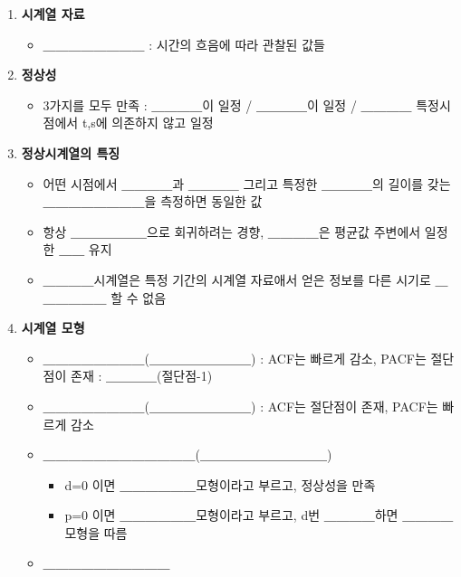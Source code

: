 \documentclass[11pt]{article}
\providecommand{\tightlist}{%
      \setlength{\itemsep}{0pt}\setlength{\parskip}{0pt}}
\begin{document}
\begin{enumerate}
\def\labelenumi{\arabic{enumi}.}
\tightlist
\item
  \textbf{시계열 자료}

  \begin{itemize}
  \tightlist
  \item
    ＿＿＿＿＿＿＿＿ : 시간의 흐음에 따라 관찰된 값들
  \end{itemize}
\item
  \textbf{정상성}

  \begin{itemize}
  \tightlist
  \item
    3가지를 모두 만족 : ＿＿＿＿이 일정 / ＿＿＿＿이 일정 / ＿＿＿＿
    특정시점에서 t,s에 의존하지 않고 일정
  \end{itemize}
\item
  \textbf{정상시계열의 특징}

  \begin{itemize}
  \tightlist
  \item
    어떤 시점에서 ＿＿＿＿과 ＿＿＿＿ 그리고 특정한 ＿＿＿＿의 길이를
    갖는 ＿＿＿＿＿＿＿＿을 측정하면 동일한 값
  \item
    항상 ＿＿＿＿＿＿으로 회귀하려는 경향, ＿＿＿＿은 평균값 주변에서
    일정한 ＿＿ 유지
  \item
    ＿＿＿＿시계열은 특정 기간의 시계열 자료애서 얻은 정보를 다른 시기로
    ＿＿＿＿＿＿ 할 수 없음
  \end{itemize}
\item
  \textbf{시계열 모형}

  \begin{itemize}
  \tightlist
  \item
    ＿＿＿＿＿＿＿＿(＿＿＿＿＿＿＿＿) : ACF는 빠르게 감소, PACF는
    절단점이 존재 : ＿＿＿＿(절단점-1)
  \item
    ＿＿＿＿＿＿＿＿(＿＿＿＿＿＿＿＿) : ACF는 절단점이 존재, PACF는
    빠르게 감소
  \item
    ＿＿＿＿＿＿＿＿＿＿＿＿(＿＿＿＿＿＿＿＿＿＿)

    \begin{itemize}
    \tightlist
    \item
      d=0 이면 ＿＿＿＿＿＿모형이라고 부르고, 정상성을 만족
    \item
      p=0 이면 ＿＿＿＿＿＿모형이라고 부르고, d번 ＿＿＿＿하면
      ＿＿＿＿모형을 따름
    \end{itemize}
  \item
    ＿＿＿＿＿＿＿＿＿＿


\end{itemize}
\end{enumerate}
\end{document}
